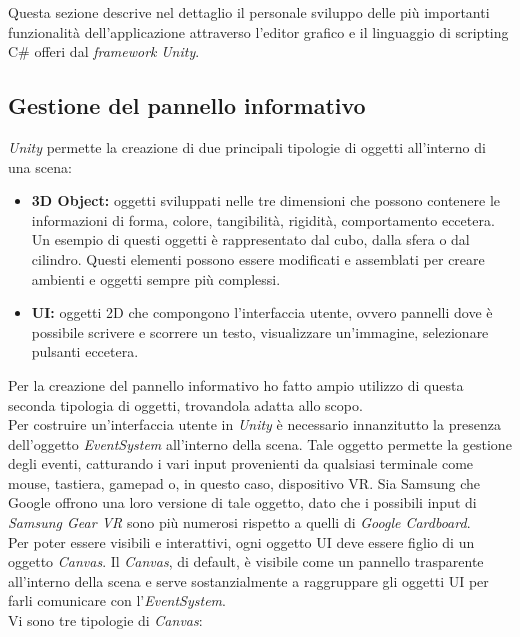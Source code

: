 Questa sezione descrive nel dettaglio il personale sviluppo delle più importanti funzionalità dell'applicazione attraverso l'editor grafico e il linguaggio di scripting C\# offeri dal \textit{framework} \textit{Unity}.

\subsection{Gestione del pannello informativo}
\textit{Unity} permette la creazione di due principali tipologie di oggetti all'interno di una scena:

\begin{itemize}
	\item \textbf{3D Object:} oggetti sviluppati nelle tre dimensioni che possono contenere le informazioni di forma, colore, tangibilità, rigidità, comportamento eccetera. \\
	Un esempio di questi oggetti è rappresentato dal cubo, dalla sfera o dal cilindro. Questi elementi possono essere modificati e assemblati per creare ambienti e oggetti sempre più complessi.
	\item \textbf{UI:} oggetti 2D che compongono l'interfaccia utente, ovvero pannelli dove è possibile scrivere e scorrere un testo, visualizzare un'immagine, selezionare pulsanti eccetera.
\end{itemize}

Per la creazione del pannello informativo ho fatto ampio utilizzo di questa seconda tipologia di oggetti, trovandola adatta allo scopo. \\
Per costruire un'interfaccia utente in \textit{Unity} è necessario innanzitutto la presenza dell'oggetto \textit{EventSystem} all'interno della scena. Tale oggetto permette la gestione degli eventi, catturando i vari input provenienti da qualsiasi terminale come mouse, tastiera, gamepad o, in questo caso, dispositivo VR. Sia Samsung che Google offrono una loro versione di tale oggetto, dato che i possibili input di \textit{Samsung Gear VR} sono più numerosi rispetto a quelli di \textit{Google Cardboard}. \\
Per poter essere visibili e interattivi, ogni oggetto UI deve essere figlio di un oggetto \textit{Canvas}. Il \textit{Canvas}, di default, è visibile come un pannello trasparente all'interno della scena e serve sostanzialmente a raggruppare gli oggetti UI per farli comunicare con l'\textit{EventSystem}. \\
Vi sono tre tipologie di \textit{Canvas}:

